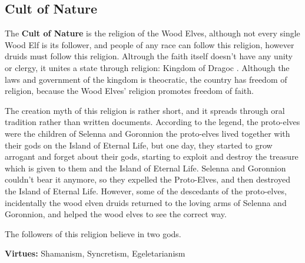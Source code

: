 \subsection{Cult of Nature}


The \textbf{Cult of Nature} is the religion of the Wood Elves, although not every single Wood Elf is its follower, and people of any race can follow this religion, however druids must follow this religion. Altrough the faith itself doesn't have any unity or clergy, it unites a state through religion: Kingdom of Dragoc . Although the laws and government of the kingdom is theocratic, the country has freedom of religion, because the Wood Elves’ religion promotes freedom of faith.

The creation myth of this religion is rather short, and it spreads through oral tradition rather than written documents. According to the legend, the proto-elves were the children of Selenna and Goronnion the proto-elves lived together with their gods  on the Island of Eternal Life, but one day, they started to grow arrogant and forget about their gods, starting to exploit and destroy the treasure which is given to them and the Island of Eternal Life. Selenna and Goronnion couldn’t bear it anymore, so they expelled the Proto-Elves, and then destroyed the Island of Eternal Life. However, some of the descedants of the proto-elves, incidentally the wood elven druids returned to the loving arms of Selenna and Goronnion, and helped the wood elves to see the correct way.

The followers of this religion believe in two gods.

\textbf{Virtues:} Shamanism, Syncretism, Egeletarianism

